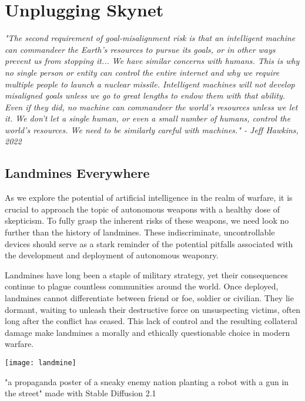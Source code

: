\setchapterpreamble[u]{\margintoc}
\chapter{Unplugging Skynet}

\textit{"The second requirement of goal-misalignment risk is that an intelligent machine can commandeer the Earth's resources to pursue its goals, or in other ways prevent us from stopping it... We have similar concerns with humans. This is why no single person or entity can control the entire internet and why we require multiple people to launch a nuclear missile. Intelligent machines will not develop misaligned goals unless we go to great lengths to endow them with that ability. Even if they did, no machine can commandeer the world's resources unless we let it. We don't let a single human, or even a small number of humans, control the world's resources. We need to be similarly careful with machines." - Jeff Hawkins, 2022 \cite{hawkins2022}}

\section{Landmines Everywhere}

As we explore the potential of artificial intelligence in the realm of warfare, it is crucial to approach the topic of autonomous weapons with a healthy dose of skepticism. To fully grasp the inherent risks of these weapons, we need look no further than the history of landmines. These indiscriminate, uncontrollable devices should serve as a stark reminder of the potential pitfalls associated with the development and deployment of autonomous weaponry.

Landmines have long been a staple of military strategy, yet their consequences continue to plague countless communities around the world. Once deployed, landmines cannot differentiate between friend or foe, soldier or civilian. They lie dormant, waiting to unleash their destructive force on unsuspecting victims, often long after the conflict has ceased. This lack of control and the resulting collateral damage make landmines a morally and ethically questionable choice in modern warfare.

\begin{pdf}
\begin{marginfigure}[-5.5cm]
        \texttt{[image: landmine]}
        \caption{"a propaganda poster of a sneaky enemy nation planting a robot with a gun in the street" made with Stable Diffusion 2.1}
\end{marginfigure}
\end{pdf}

